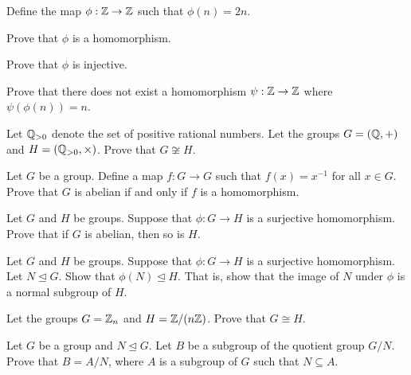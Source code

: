 \begin{problem}
    Define the map $\phi: \mathbb{Z} \to \mathbb{Z}$ such that $\phi(n) = 2n$.
    \begin{partquestions}{\alph*}
        \item Prove that $\phi$ is a homomorphism.
        \item Prove that $\phi$ is injective.
        \item Prove that there does not exist a homomorphism $\psi: \mathbb{Z} \to \mathbb{Z}$ where $\psi(\phi(n)) = n$.
    \end{partquestions}
\end{problem}

\begin{problem}
    Let $\mathbb{Q}_{>0}$ denote the set of positive rational numbers. Let the groups $G = (\mathbb{Q}, +)$ and $H = (\mathbb{Q}_{>0}, \times)$. Prove that $G \not\cong H$.
\end{problem}

\begin{problem}
    Let $G$ be a group. Define a map $f: G \to G$ such that $f(x) = x^{-1}$ for all $x \in G$. Prove that $G$ is abelian if and only if $f$ is a homomorphism.
\end{problem}

\begin{problem}
    Let $G$ and $H$ be groups. Suppose that $\phi: G \to H$ is a surjective homomorphism. Prove that if $G$ is abelian, then so is $H$.
\end{problem}

\begin{problem}
    Let $G$ and $H$ be groups. Suppose that $\phi: G \to H$ is a surjective homomorphism. Let $N \unlhd G$. Show that $\phi(N) \unlhd H$. That is, show that the image of $N$ under $\phi$ is a normal subgroup of $H$.
\end{problem}

\begin{problem}\label{problem-Zn-isomorphic-to-Z-by-nZ}
    Let the groups $G = \mathbb{Z}_n$ and $H = \mathbb{Z}/(n\mathbb{Z})$. Prove that $G \cong H$.
\end{problem}

\begin{problem}\label{problem-subgroup-of-quotient-group-is-quotient-group}
    Let $G$ be a group and $N \unlhd G$. Let $B$ be a subgroup of the quotient group $G/N$. Prove that $B = A/N$, where $A$ is a subgroup of $G$ such that $N \subseteq A$.
\end{problem}
